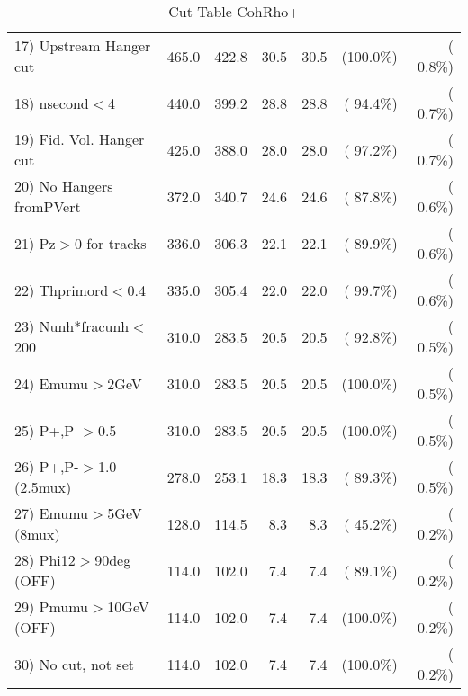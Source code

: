 \begin{table}[h!]
\begin{tabular}{||l||r|r|r|r|r|r||}
 17) Upstream Hanger cut  &        465.0 &        422.8 &         30.5 &         30.5 & (100.0\%) & (  0.8\%) \\
 18) nsecond$<$4          &        440.0 &        399.2 &         28.8 &         28.8 & ( 94.4\%) & (  0.7\%) \\
 19) Fid. Vol. Hanger cut &        425.0 &        388.0 &         28.0 &         28.0 & ( 97.2\%) & (  0.7\%) \\
 20) No Hangers fromPVert &        372.0 &        340.7 &         24.6 &         24.6 & ( 87.8\%) & (  0.6\%) \\
 21) Pz$>$0 for tracks    &        336.0 &        306.3 &         22.1 &         22.1 & ( 89.9\%) & (  0.6\%) \\
 22) Thprimord$<$0.4      &        335.0 &        305.4 &         22.0 &         22.0 & ( 99.7\%) & (  0.6\%) \\
 23) Nunh*fracunh$<$200   &        310.0 &        283.5 &         20.5 &         20.5 & ( 92.8\%) & (  0.5\%) \\
 24) Emumu$>$2GeV         &        310.0 &        283.5 &         20.5 &         20.5 & (100.0\%) & (  0.5\%) \\
 25) P+,P-$>$0.5          &        310.0 &        283.5 &         20.5 &         20.5 & (100.0\%) & (  0.5\%) \\
 26) P+,P-$>$1.0 (2.5mux) &        278.0 &        253.1 &         18.3 &         18.3 & ( 89.3\%) & (  0.5\%) \\
 27) Emumu$>$5GeV  (8mux) &        128.0 &        114.5 &          8.3 &          8.3 & ( 45.2\%) & (  0.2\%) \\
 28) Phi12$>$90deg  (OFF) &        114.0 &        102.0 &          7.4 &          7.4 & ( 89.1\%) & (  0.2\%) \\
 29) Pmumu$>$10GeV  (OFF) &        114.0 &        102.0 &          7.4 &          7.4 & (100.0\%) & (  0.2\%) \\
 30) No cut, not set      &        114.0 &        102.0 &          7.4 &          7.4 & (100.0\%) & (  0.2\%) \\
 \hline
 \hline
 \end{tabular}
 \caption{Cut Table  CohRho+  }
 \label{tab-cutcohjpsi-mumu_anumunc}
 \end{table}
